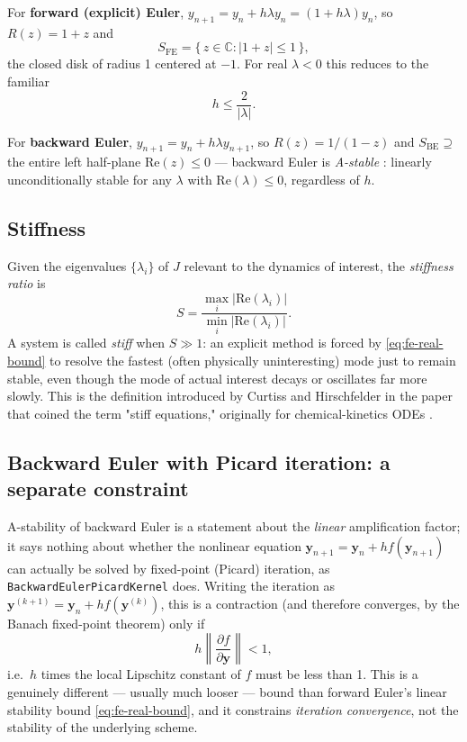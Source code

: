 \documentclass[11pt]{article}
\begin{document}
For \textbf{forward (explicit) Euler}, $y_{n+1} = y_n + h\lambda y_n = (1+h\lambda) y_n$, so
$R(z) = 1+z$ and
\begin{equation}
  S_{\text{FE}} = \{\, z \in \mathbb{C} : |1+z| \le 1 \,\},
\end{equation}
the closed disk of radius 1 centered at $-1$. For real $\lambda < 0$ this reduces to the
familiar
\begin{equation}
  h \le \frac{2}{|\lambda|}.
  \label{eq:fe-real-bound}
\end{equation}

For \textbf{backward Euler}, $y_{n+1} = y_n + h\lambda y_{n+1}$, so $R(z) = 1/(1-z)$ and
$S_{\text{BE}} \supseteq$ the entire left half-plane $\mathrm{Re}(z) \le 0$ — backward Euler
is \emph{A-stable} \cite{dahlquist1963}: linearly unconditionally stable for any $\lambda$
with $\mathrm{Re}(\lambda) \le 0$, regardless of $h$.

\subsection{Stiffness}

Given the eigenvalues $\{\lambda_i\}$ of $J$ relevant to the dynamics of interest, the
\emph{stiffness ratio} is
\begin{equation}
  S = \frac{\max_i |\mathrm{Re}(\lambda_i)|}{\min_i |\mathrm{Re}(\lambda_i)|}.
\end{equation}
A system is called \emph{stiff} when $S \gg 1$: an explicit method is forced by
\eqref{eq:fe-real-bound} to resolve the fastest (often physically uninteresting) mode just
to remain stable, even though the mode of actual interest decays or oscillates far more
slowly. This is the definition introduced by Curtiss and Hirschfelder in the paper that
coined the term "stiff equations," originally for chemical-kinetics ODEs
\cite{curtisshirschfelder1952}.

\subsection{Backward Euler with Picard iteration: a separate constraint}

A-stability of backward Euler is a statement about the \emph{linear} amplification factor;
it says nothing about whether the nonlinear equation $\mathbf{y}_{n+1} = \mathbf{y}_n + h
f(\mathbf{y}_{n+1})$ can actually be solved by fixed-point (Picard) iteration, as
\texttt{BackwardEulerPicardKernel} does. Writing the iteration as
$\mathbf{y}^{(k+1)} = \mathbf{y}_n + h f(\mathbf{y}^{(k)})$, this is a contraction (and
therefore converges, by the Banach fixed-point theorem) only if
\begin{equation}
  h \left\| \frac{\partial f}{\partial \mathbf{y}} \right\| < 1,
  \label{eq:picard-contraction}
\end{equation}
i.e.\ $h$ times the local Lipschitz constant of $f$ must be less than 1. This is a
genuinely different — usually much looser — bound than forward Euler's linear stability
bound \eqref{eq:fe-real-bound}, and it constrains \emph{iteration convergence}, not the
stability of the underlying scheme.
\end{document}
